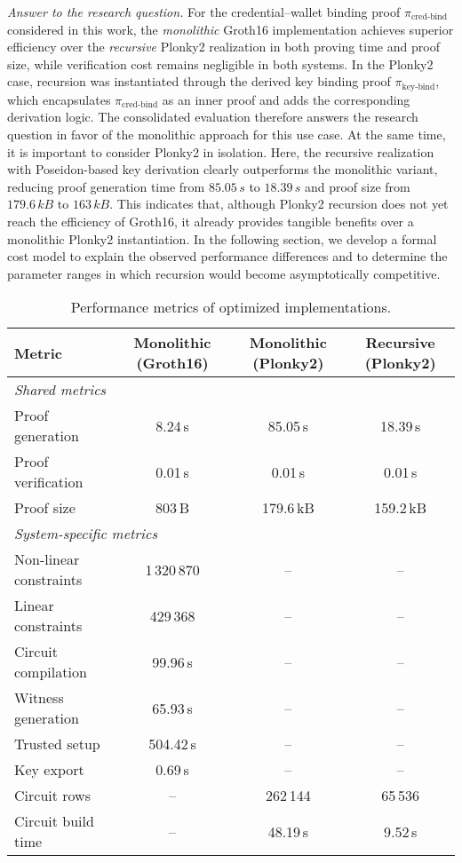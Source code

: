 \medskip
\emph{Answer to the research question.}
For the credential–wallet binding proof $\pi_{\text{cred-bind}}$ considered in this work, the \emph{monolithic} Groth16 implementation achieves superior efficiency over the \emph{recursive} Plonky2 realization in both proving time and proof size, while verification cost remains negligible in both systems. In the Plonky2 case, recursion was instantiated through the derived key binding proof $\pi_{\text{key-bind}}$, which encapsulates $\pi_{\text{cred-bind}}$ as an inner proof and adds the corresponding derivation logic. The consolidated evaluation therefore answers the research question in favor of the monolithic approach for this use case. At the same time, it is important to consider Plonky2 in isolation. Here, the recursive realization with Poseidon-based key derivation clearly outperforms the monolithic variant, reducing proof generation time from $85.05\,s$ to $18.39\,s$ and proof size from $179.6\,kB$ to $163\,kB$. This indicates that, although Plonky2 recursion does not yet reach the efficiency of Groth16, it already provides tangible benefits over a monolithic Plonky2 instantiation. In the following section, we develop a formal cost model to explain the observed performance differences and to determine the parameter ranges in which recursion would become asymptotically competitive.

\begin{table}[ht]
	\centering
	\begin{tabular}{lccc}
		\toprule
		\textbf{Metric} & \textbf{Monolithic (Groth16)} & \textbf{Monolithic (Plonky2)} & \textbf{Recursive (Plonky2)} \\
		\midrule
		\multicolumn{4}{l}{\emph{Shared metrics}} \\
		\midrule
		Proof generation      & 8.24\,s     & 85.05\,s     & 18.39\,s \\
		Proof verification    & 0.01\,s     & 0.01\,s      & 0.01\,s \\
		Proof size            & 803\,B      & 179.6\,kB    & 159.2\,kB \\
		\midrule
		\multicolumn{4}{l}{\emph{System-specific metrics}} \\
		\midrule
		Non-linear constraints & 1\,320\,870 & --           & -- \\
		Linear constraints     & 429\,368    & --           & -- \\
		Circuit compilation    & 99.96\,s    & --           & -- \\
		Witness generation     & 65.93\,s    & --           & -- \\
		Trusted setup          & 504.42\,s   & --           & -- \\
		Key export             & 0.69\,s     & --           & -- \\
		Circuit rows           & --          & 262\,144     & 65\,536 \\
		Circuit build time     & --          & 48.19\,s     & 9.52\,s \\
		\bottomrule
	\end{tabular}
	\caption{Performance metrics of optimized implementations.}
	\label{tab:consolidated-performance}
\end{table}


